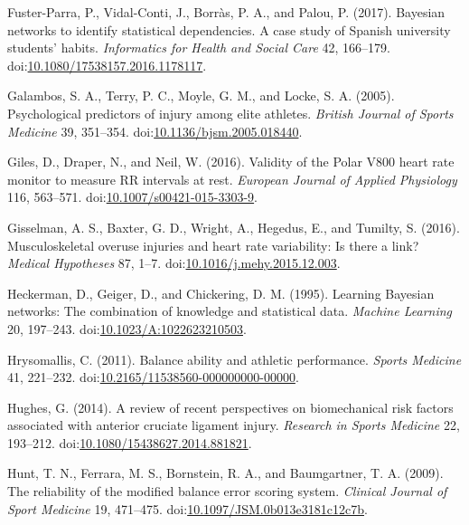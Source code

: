 \documentclass[
  english,
  man]{apa6}
\newlength{\cslhangindent}
\newenvironment{cslreferences}%
  {\setlength{\parindent}{0pt}%
  \everypar{\setlength{\hangindent}{\cslhangindent}}\ignorespaces}%
  {\par}
\begin{document}
\begin{cslreferences}
\leavevmode\hypertarget{ref-Fuster-Parra2017}{}%
Fuster-Parra, P., Vidal-Conti, J., Borràs, P. A., and Palou, P. (2017). Bayesian networks to identify statistical dependencies. A case study of Spanish university students' habits. \emph{Informatics for Health and Social Care} 42, 166--179. doi:\href{https://doi.org/10.1080/17538157.2016.1178117}{10.1080/17538157.2016.1178117}.

\leavevmode\hypertarget{ref-Galambos2005}{}%
Galambos, S. A., Terry, P. C., Moyle, G. M., and Locke, S. A. (2005). Psychological predictors of injury among elite athletes. \emph{British Journal of Sports Medicine} 39, 351--354. doi:\href{https://doi.org/10.1136/bjsm.2005.018440}{10.1136/bjsm.2005.018440}.

\leavevmode\hypertarget{ref-Giles2016}{}%
Giles, D., Draper, N., and Neil, W. (2016). Validity of the Polar V800 heart rate monitor to measure RR intervals at rest. \emph{European Journal of Applied Physiology} 116, 563--571. doi:\href{https://doi.org/10.1007/s00421-015-3303-9}{10.1007/s00421-015-3303-9}.

\leavevmode\hypertarget{ref-Gisselman2016}{}%
Gisselman, A. S., Baxter, G. D., Wright, A., Hegedus, E., and Tumilty, S. (2016). Musculoskeletal overuse injuries and heart rate variability: Is there a link? \emph{Medical Hypotheses} 87, 1--7. doi:\href{https://doi.org/10.1016/j.mehy.2015.12.003}{10.1016/j.mehy.2015.12.003}.

\leavevmode\hypertarget{ref-Heckerman1995}{}%
Heckerman, D., Geiger, D., and Chickering, D. M. (1995). Learning Bayesian networks: The combination of knowledge and statistical data. \emph{Machine Learning} 20, 197--243. doi:\href{https://doi.org/10.1023/A:1022623210503}{10.1023/A:1022623210503}.

\leavevmode\hypertarget{ref-Hrysomallis2011}{}%
Hrysomallis, C. (2011). Balance ability and athletic performance. \emph{Sports Medicine} 41, 221--232. doi:\href{https://doi.org/10.2165/11538560-000000000-00000}{10.2165/11538560-000000000-00000}.

\leavevmode\hypertarget{ref-Hughes2014}{}%
Hughes, G. (2014). A review of recent perspectives on biomechanical risk factors associated with anterior cruciate ligament injury. \emph{Research in Sports Medicine} 22, 193--212. doi:\href{https://doi.org/10.1080/15438627.2014.881821}{10.1080/15438627.2014.881821}.

\leavevmode\hypertarget{ref-Hunt2009}{}%
Hunt, T. N., Ferrara, M. S., Bornstein, R. A., and Baumgartner, T. A. (2009). The reliability of the modified balance error scoring system. \emph{Clinical Journal of Sport Medicine} 19, 471--475. doi:\href{https://doi.org/10.1097/JSM.0b013e3181c12c7b}{10.1097/JSM.0b013e3181c12c7b}.


\end{cslreferences}
\end{document}
